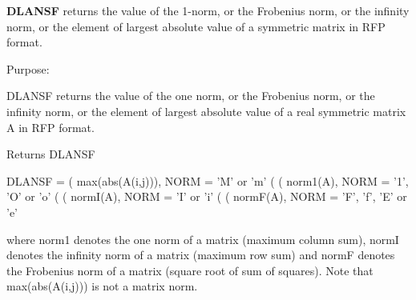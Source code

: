 {\bfseries D\+L\+A\+N\+S\+F} returns the value of the 1-\/norm, or the Frobenius norm, or the infinity norm, or the element of largest absolute value of a symmetric matrix in R\+F\+P format. 

 \begin{DoxyParagraph}{Purpose\+: }
\begin{DoxyVerb} DLANSF returns the value of the one norm, or the Frobenius norm, or
 the infinity norm, or the element of largest absolute value of a
 real symmetric matrix A in RFP format.\end{DoxyVerb}

\end{DoxyParagraph}
\begin{DoxyReturn}{Returns}
D\+L\+A\+N\+S\+F \begin{DoxyVerb}    DLANSF = ( max(abs(A(i,j))), NORM = 'M' or 'm'
             (
             ( norm1(A),         NORM = '1', 'O' or 'o'
             (
             ( normI(A),         NORM = 'I' or 'i'
             (
             ( normF(A),         NORM = 'F', 'f', 'E' or 'e'

 where  norm1  denotes the  one norm of a matrix (maximum column sum),
 normI  denotes the  infinity norm  of a matrix  (maximum row sum) and
 normF  denotes the  Frobenius norm of a matrix (square root of sum of
 squares).  Note that  max(abs(A(i,j)))  is not a  matrix norm.\end{DoxyVerb}
 
\end{DoxyReturn}


